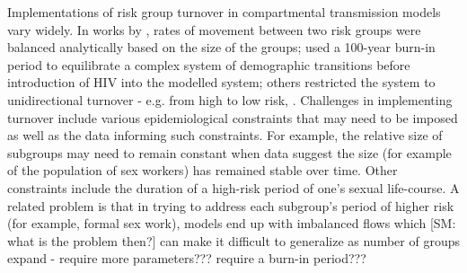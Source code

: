 Implementations of risk group turnover in compartmental transmission models vary widely.  %
In works by \citeauthor{Koopman1997},
rates of movement between two risk groups
were balanced analytically based on the size of the groups;
\citet{Boily2015} used a 100-year burn-in period
to equilibrate a complex system of demographic transitions before 
introduction of HIV into the modelled system;
others restricted the system to unidirectional turnover - e.g. from high to low risk,
\citep{Stigum1994,Eaton2014}.
Challenges in implementing turnover include various epidemiological 
constraints that may need to be imposed as well as the data informing such constraints.
For example, the relative size of subgroups may need to remain constant when data 
suggest the size (for example of the population of sex workers) has remained stable over time. %
Other constraints include the duration of a high-risk period of one's sexual life-course.  %
A related problem is that in trying to address each subgroup's period of higher risk
(for example, formal sex work), models end up with imbalanced flows which [SM: what is the problem then?]
can make it difficult to generalize as number of groups expand - require more parameters??? require a burn-in period???



